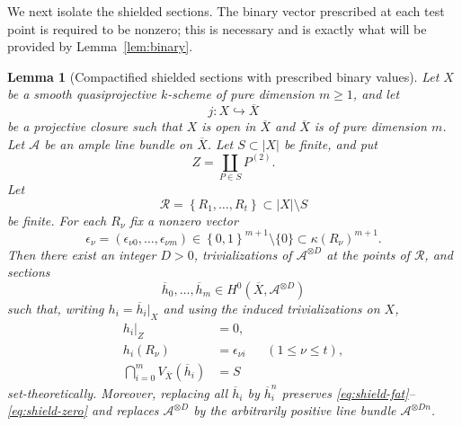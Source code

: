 \documentclass{lms}
\newtheorem{lemma}[theorem]{Lemma}
\newcommand{\Ample}{\mathcal A}
\newcommand{\kk}{\kappa}
\newcommand{\barX}{\overline{X}}
\newcommand{\set}[1]{\left\{#1\right\}}
\begin{document}
We next isolate the shielded sections.  The binary vector prescribed at each test point is required to be nonzero; this is necessary and is exactly what will be provided by Lemma~\ref{lem:binary}.

\begin{lemma}[Compactified shielded sections with prescribed binary values]\label{lem:shield}
Let $X$ be a smooth quasiprojective $k$-scheme of pure dimension $m\ge1$, and let
\[
        j:X\hookrightarrow\barX
\]
be a projective closure such that $X$ is open in $\barX$ and $\barX$ is of pure dimension $m$.  Let $\Ample$ be an ample line bundle on $\barX$.  Let $S\subset |X|$ be finite, and put
\[
        Z=\coprod_{P\in S}P^{(2)}.
\]
Let
\[
        \mathcal R=\set{R_1,\ldots,R_t}\subset |X|\setminus S
\]
be finite.  For each $R_\nu$ fix a nonzero vector
\[
        \epsilon_\nu=(\epsilon_{\nu0},\ldots,\epsilon_{\nu m})
        \in\set{0,1}^{m+1}\setminus\{0\}
        \subset \kk(R_\nu)^{m+1}.
\]
Then there exist an integer $D>0$, trivializations of $\Ample^{\otimes D}$ at the points of $\mathcal R$, and sections
\[
        \overline h_0,\ldots,\overline h_m\in H^0(\barX,\Ample^{\otimes D})
\]
such that, writing $h_i=\overline h_i|_X$ and using the induced trivializations on $X$,
\begin{align}
        h_i|_Z&=0,                                                    \label{eq:shield-fat}\\
        h_i(R_\nu)&=\epsilon_{\nu i}       &&(1\le\nu\le t),          \label{eq:shield-values}\\
        \bigcap_{i=0}^{m}V_{\barX}(\overline h_i)&=S                  \label{eq:shield-zero}
\end{align}
set-theoretically.  Moreover, replacing all $\overline h_i$ by $\overline h_i^n$ preserves \eqref{eq:shield-fat}--\eqref{eq:shield-zero} and replaces $\Ample^{\otimes D}$ by the arbitrarily positive line bundle $\Ample^{\otimes Dn}$.
\end{lemma}
\end{document}
